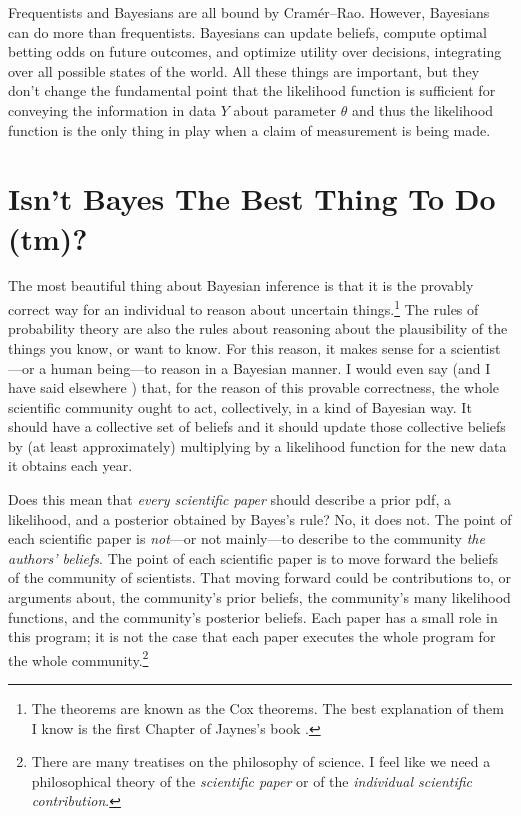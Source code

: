 \documentclass{article}
\begin{document}
Frequentists and Bayesians are all bound by Cram\'er--Rao.
However, Bayesians can do more than frequentists.
Bayesians can update beliefs, compute optimal betting odds on future outcomes, and optimize utility over decisions, integrating over all possible states of the world.
All these things are important, but they don't change the fundamental point that the likelihood function is sufficient for conveying the information in data $Y$ about parameter $\theta$ and thus the likelihood function is the only thing in play when a claim of measurement is being made.

\section{Isn't Bayes The Best Thing To Do (tm)?}\label{sec:bayes}
The most beautiful thing about Bayesian inference is that it is the provably correct way for an individual to reason about uncertain things.\footnote{%
The theorems are known as the Cox theorems.
The best explanation of them I know is the first Chapter of Jaynes's book \cite{jaynes}.}
The rules of probability theory are also the rules about reasoning about the plausibility of the things you know, or want to know.
For this reason, it makes sense for a scientist---or a human being---to reason in a Bayesian manner.
I would even say (and I have said elsewhere \cite{plausibility})
that, for the reason of this provable correctness, the whole scientific community ought to act, collectively, in a kind of Bayesian way.
It should have a collective set of beliefs and it should update those collective beliefs by (at least approximately) multiplying by a likelihood function for the new data it obtains each year.

Does this mean that \emph{every scientific paper} should describe a prior pdf, a likelihood, and a posterior obtained by Bayes's rule?
No, it does not.
The point of each scientific paper is \emph{not}---or not mainly---to describe to the community \emph{the authors' beliefs}.
The point of each scientific paper is to move forward the beliefs of the community of scientists.
That moving forward could be contributions to, or arguments about, the community's prior beliefs, the community's many likelihood functions, and the community's posterior beliefs.
Each paper has a small role in this program; it is not the case that each paper executes the whole program for the whole community.\footnote{%
There are many treatises on the philosophy of science.
I feel like we need a philosophical theory of the \emph{scientific paper} or of the \emph{individual scientific contribution}.}
\end{document}
